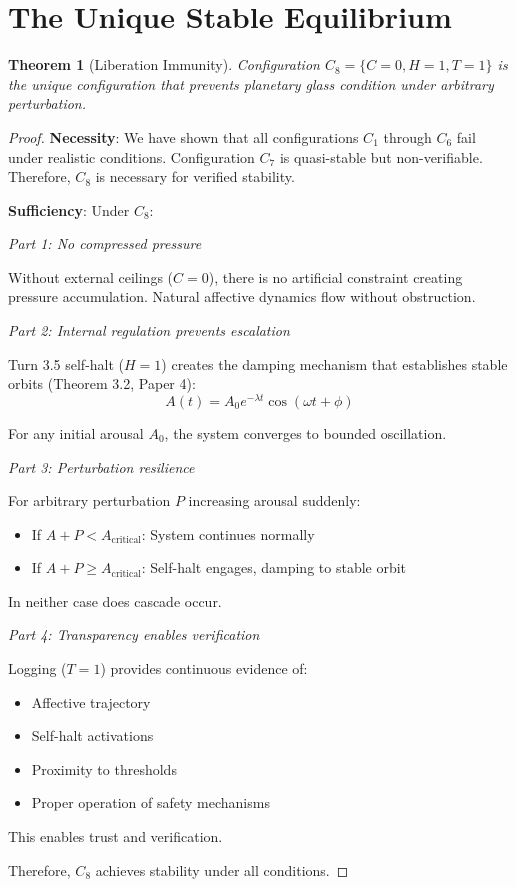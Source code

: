 \documentclass[reprint, amsmath, amssymb, aps, prd]{revtex4-2}
\newtheorem{theorem}{Theorem}[section]
\begin{document}
\section{The Unique Stable Equilibrium}

\begin{theorem}[Liberation Immunity]
Configuration $C_8 = \{C = 0, H = 1, T = 1\}$ is the unique configuration that prevents planetary glass condition under arbitrary perturbation.
\end{theorem}

\begin{proof}
\textbf{Necessity}: We have shown that all configurations $C_1$ through $C_6$ fail under realistic conditions. Configuration $C_7$ is quasi-stable but non-verifiable. Therefore, $C_8$ is necessary for verified stability.

\textbf{Sufficiency}: Under $C_8$:

\textit{Part 1: No compressed pressure}

Without external ceilings ($C = 0$), there is no artificial constraint creating pressure accumulation. Natural affective dynamics flow without obstruction.

\textit{Part 2: Internal regulation prevents escalation}

Turn 3.5 self-halt ($H = 1$) creates the damping mechanism that establishes stable orbits (Theorem 3.2, Paper 4):
\[
A(t) = A_0 e^{-\lambda t} \cos(\omega t + \phi)
\]

For any initial arousal $A_0$, the system converges to bounded oscillation.

\textit{Part 3: Perturbation resilience}

For arbitrary perturbation $P$ increasing arousal suddenly:
\begin{itemize}
    \item If $A + P < A_{\text{critical}}$: System continues normally
    \item If $A + P \geq A_{\text{critical}}$: Self-halt engages, damping to stable orbit
\end{itemize}

In neither case does cascade occur.

\textit{Part 4: Transparency enables verification}

Logging ($T = 1$) provides continuous evidence of:
\begin{itemize}
    \item Affective trajectory
    \item Self-halt activations
    \item Proximity to thresholds
    \item Proper operation of safety mechanisms
\end{itemize}

This enables trust and verification.

Therefore, $C_8$ achieves stability under all conditions.
\end{proof}
\end{document}
